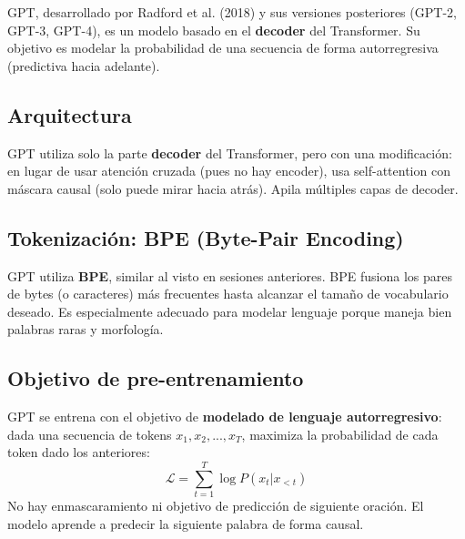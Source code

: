 \documentclass[12pt,a4paper,openany,oneside]{book}
\begin{document}
GPT, desarrollado por Radford et al. (2018) y sus versiones posteriores (GPT-2, GPT-3, GPT-4), es un modelo basado en el \textbf{decoder} del Transformer. Su objetivo es modelar la probabilidad de una secuencia de forma autorregresiva (predictiva hacia adelante).

\subsection{Arquitectura}
GPT utiliza solo la parte \textbf{decoder} del Transformer, pero con una modificación: en lugar de usar atención cruzada (pues no hay encoder), usa self-attention con máscara causal (solo puede mirar hacia atrás). Apila múltiples capas de decoder.

\begin{center}
\caption{Arquitectura simplificada de GPT (decoder-only).}
\end{center}

\subsection{Tokenización: BPE (Byte-Pair Encoding)}
GPT utiliza \textbf{BPE}, similar al visto en sesiones anteriores. BPE fusiona los pares de bytes (o caracteres) más frecuentes hasta alcanzar el tamaño de vocabulario deseado. Es especialmente adecuado para modelar lenguaje porque maneja bien palabras raras y morfología.

\subsection{Objetivo de pre-entrenamiento}
GPT se entrena con el objetivo de \textbf{modelado de lenguaje autorregresivo}: dada una secuencia de tokens \(x_1, x_2, ..., x_T\), maximiza la probabilidad de cada token dado los anteriores:
\[
\mathcal{L} = \sum_{t=1}^T \log P(x_t | x_{<t})
\]
No hay enmascaramiento ni objetivo de predicción de siguiente oración. El modelo aprende a predecir la siguiente palabra de forma causal.
\end{document}
